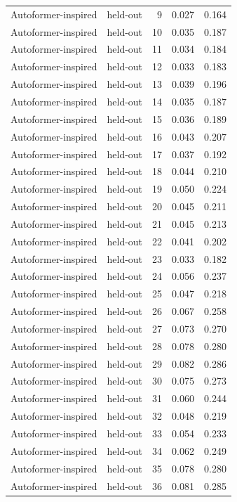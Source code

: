 \begin{tabular}{llrrr}
Autoformer-inspired & held-out & 9 & 0.027 & 0.164 \\
Autoformer-inspired & held-out & 10 & 0.035 & 0.187 \\
Autoformer-inspired & held-out & 11 & 0.034 & 0.184 \\
Autoformer-inspired & held-out & 12 & 0.033 & 0.183 \\
Autoformer-inspired & held-out & 13 & 0.039 & 0.196 \\
Autoformer-inspired & held-out & 14 & 0.035 & 0.187 \\
Autoformer-inspired & held-out & 15 & 0.036 & 0.189 \\
Autoformer-inspired & held-out & 16 & 0.043 & 0.207 \\
Autoformer-inspired & held-out & 17 & 0.037 & 0.192 \\
Autoformer-inspired & held-out & 18 & 0.044 & 0.210 \\
Autoformer-inspired & held-out & 19 & 0.050 & 0.224 \\
Autoformer-inspired & held-out & 20 & 0.045 & 0.211 \\
Autoformer-inspired & held-out & 21 & 0.045 & 0.213 \\
Autoformer-inspired & held-out & 22 & 0.041 & 0.202 \\
Autoformer-inspired & held-out & 23 & 0.033 & 0.182 \\
Autoformer-inspired & held-out & 24 & 0.056 & 0.237 \\
Autoformer-inspired & held-out & 25 & 0.047 & 0.218 \\
Autoformer-inspired & held-out & 26 & 0.067 & 0.258 \\
Autoformer-inspired & held-out & 27 & 0.073 & 0.270 \\
Autoformer-inspired & held-out & 28 & 0.078 & 0.280 \\
Autoformer-inspired & held-out & 29 & 0.082 & 0.286 \\
Autoformer-inspired & held-out & 30 & 0.075 & 0.273 \\
Autoformer-inspired & held-out & 31 & 0.060 & 0.244 \\
Autoformer-inspired & held-out & 32 & 0.048 & 0.219 \\
Autoformer-inspired & held-out & 33 & 0.054 & 0.233 \\
Autoformer-inspired & held-out & 34 & 0.062 & 0.249 \\
Autoformer-inspired & held-out & 35 & 0.078 & 0.280 \\
Autoformer-inspired & held-out & 36 & 0.081 & 0.285 \\

\end{tabular}
